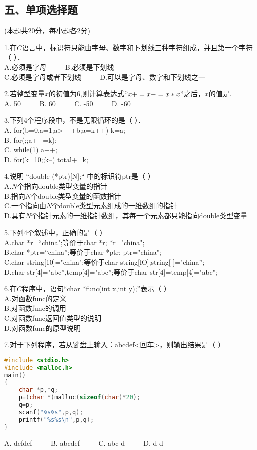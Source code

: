 \subsection{五、单项选择题}
(本题共20分，每小题各2分)

1.在$C$语言中，标识符只能由字母、数字和卜划线三种字符组成，并且第一个字符（    ）． \\
A.必须是字母 $\qquad$ B.必须是下划线 \\
C.必须是字母或者下划线 $\qquad$ D.可以是字母、数字和下划线之一

2.若整型变量$x$的初值为$6$,则计算表达式$"x+=x-=x*x"$之后，$x$的值是. \\
A. 50 $\qquad$ B. 60 $\qquad$ C. -50 $\qquad$ D. -60

3.下列4个程序段中，不是无限循环的是（    ）． \\
A. for(b=0,a=1;a>-++b;a=k++) k=a; \\
B. for(;;a++=k); \\
C. while(1) {a++;} \\
D. for(k=10;;k--) total+=k;

4.说明 “double (*ptr)[N];“ 中的标识符ptr是（    ） \\
A.$N$个指向double类型变量的指针 \\
B.指向$N$个double类型变量的函数指针 \\
C.一个指向由$N$个double类型元素组成的一维数组的指针 \\
D.具有$N$个指针元素的一维指针数组，其每一个元素都只能指向double类型变量

5.下列4个叙述中，正确的是（    ） \\
A.char *r=“china";等价于char *r; *r="china"; \\
B.char *ptr=“china”;等价于char *ptr; ptr="china"; \\
C.char string[10]={"china"};等价于char string[lO];string[ ]={"china”}; \\
D.char str[4]="abc”,temp[4]="abc”;等价于char str[4]=temp[4]="abc";

6.在$C$程序中，语句“char *func(int x,int y);”表示（    ） \\
A.对函数func的定义 \\
B.对函数func的调用 \\
C.对函数func返回值类型的说明 \\
D.对函数func的原型说明

7.对于下列程序，若从键盘上输入：abcdef<回车>，则输出结果是（    ）  \\
\begin{lstlisting}[language=cpp]
#include <stdio.h>
#include <malloc.h>
main()
{
    char *p,*q;
    p=(char *)malloc(sizeof(char)*20);
    q=p;
    scanf("%s%s",p,q);
    printf("%s%s\n",p,q);
}
\end{lstlisting}
A. defdef $\qquad$ B. abcdef $\qquad$ C. abc d	$\qquad$ D. d d

